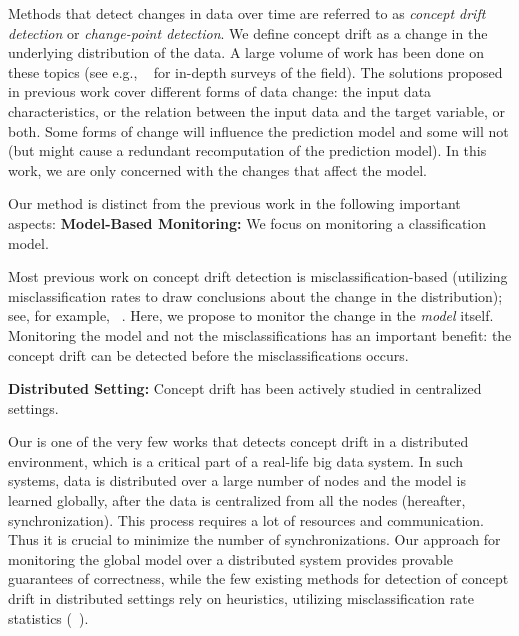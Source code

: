 Methods that detect changes in data over time are referred to as {\em concept drift detection} or {\em change-point detection}. We define concept drift as a change in the underlying distribution of the data.
A large volume of work has been done on these topics
(see e.g., ~\cite{basseville1993detection,brodsky2013nonparametric,ChenGupta2000,Tsymbal,Gama2014}
for in-depth surveys of the field).
The solutions proposed in previous work cover different forms of data change:
the input data characteristics, or the relation between the input data and the target variable, or both.
Some forms of change will influence the prediction model and some will not
(but might cause a redundant recomputation of the prediction model).
In this work, we are only concerned with the changes that affect the model.

Our method is distinct from the previous work in the following important aspects:
\noindent \textbf{Model-Based Monitoring:} We focus on monitoring a classification model.

Most previous work on concept drift detection is misclassification-based (utilizing misclassification rates to draw conclusions about the change in the distribution); see, for example, ~\cite{baena2006early,gama2004learning,Nishida2007}.
Here, we propose to monitor the change in the {\em model} itself.
Monitoring the model and not the misclassifications has an important benefit: the concept drift can be detected before the misclassifications occurs.

\noindent \textbf{Distributed Setting:} Concept drift has been actively studied in centralized settings.

    Our is one of the very few works that detects concept drift in a distributed
    environment, which is a critical part of a real-life big data system.
    In such systems, data is distributed over a large number of nodes and the model is learned
    globally, after the data is centralized from all the nodes (hereafter, synchronization).
    This process requires a lot of resources and communication.
    Thus it is crucial to minimize the number of synchronizations.
    Our approach for monitoring the global model over a distributed system
    provides provable guarantees of correctness, while the few existing methods for detection of concept drift in distributed settings rely on heuristics, utilizing misclassification rate statistics (~\citealt{AngGZPH13}).

